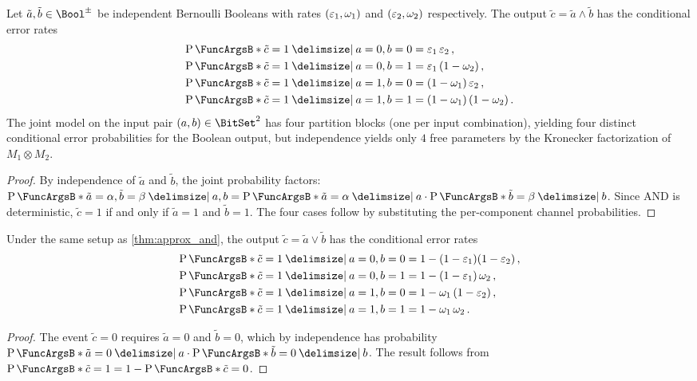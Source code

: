 \documentclass[ ../main.tex]{subfiles}
\begin{document}
\begin{theorem}
\label{thm:approx_and}
Let $\tilde{a}, \tilde{b} \in \AT{\Bool}$ be independent Bernoulli Booleans
with rates $(\varepsilon_1, \omega_1)$ and $(\varepsilon_2, \omega_2)$ respectively.
The output $\tilde{c} = \tilde{a} \wedge \tilde{b}$ has the conditional
error rates
\begin{align}
\label{eq:and_rates}
	\Prob{\tilde{c} = 1 \Given a = 0, b = 0}
		&= \fprate_1 \, \fprate_2\,, \\
	\Prob{\tilde{c} = 1 \Given a = 0, b = 1}
		&= \fprate_1 \, (1 - \fnrate_2)\,, \\
	\Prob{\tilde{c} = 1 \Given a = 1, b = 0}
		&= (1 - \fnrate_1) \, \fprate_2\,, \\
	\Prob{\tilde{c} = 1 \Given a = 1, b = 1}
		&= (1 - \fnrate_1) \, (1 - \fnrate_2)\,.
\end{align}
The joint model on the input pair $(a, b) \in \BitSet^2$ has four partition
blocks (one per input combination), yielding four distinct conditional error
probabilities for the Boolean output, but independence yields only
$4$ free parameters by the Kronecker factorization of $M_1 \otimes M_2$.
\end{theorem}
\begin{proof}
By independence of $\tilde{a}$ and $\tilde{b}$, the joint probability
factors:
$\Prob{\tilde{a} = \alpha, \tilde{b} = \beta \Given a, b}
= \Prob{\tilde{a} = \alpha \Given a} \cdot \Prob{\tilde{b} = \beta \Given b}$.
Since AND is deterministic, $\tilde{c} = 1$ if and only if
$\tilde{a} = 1$ and $\tilde{b} = 1$.
The four cases follow by substituting the per-component channel probabilities.
\end{proof}

\begin{theorem}
\label{thm:approx_or}
Under the same setup as \cref{thm:approx_and}, the output
$\tilde{c} = \tilde{a} \vee \tilde{b}$ has the conditional error rates
\begin{align}
	\Prob{\tilde{c} = 1 \Given a = 0, b = 0}
		&= 1 - (1 - \fprate_1)(1 - \fprate_2)\,, \\
	\Prob{\tilde{c} = 1 \Given a = 0, b = 1}
		&= 1 - (1 - \fprate_1)\,\fnrate_2\,, \\
	\Prob{\tilde{c} = 1 \Given a = 1, b = 0}
		&= 1 - \fnrate_1\,(1 - \fprate_2)\,, \\
	\Prob{\tilde{c} = 1 \Given a = 1, b = 1}
		&= 1 - \fnrate_1 \, \fnrate_2\,.
\end{align}
\end{theorem}
\begin{proof}
The event $\tilde{c} = 0$ requires $\tilde{a} = 0$ and $\tilde{b} = 0$,
which by independence has probability
$\Prob{\tilde{a} = 0 \Given a} \cdot \Prob{\tilde{b} = 0 \Given b}$.
The result follows from $\Prob{\tilde{c} = 1} = 1 - \Prob{\tilde{c} = 0}$.
\end{proof}
\end{document}
